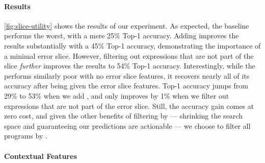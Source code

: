 \paragraph{Results}
\autoref{fig:slice-utility} shows the results of our experiment.
%
As expected, the baseline performs the worst, with a mere 25\% \linear
Top-1 accuracy.
%
Adding \InSlice improves the results substantially with a 45\% \linear Top-1
accuracy, demonstrating the importance of a minimal error slice.
%
However, filtering out expressions that are not part of the slice
\emph{further} improves the results to 54\% \linear Top-1 accuracy.
%
Interestingly, while the \hiddenFH performs similarly poor with no error
slice features, it recovers nearly all of its accuracy after being given
the error slice features.
%
Top-1 accuracy jumps from 29\% to 53\% when we add \InSlice, and only
improves by 1\% when we filter out expressions that are not part of the
error slice.
%
Still, the accuracy gain comes at zero cost, and given the other benefits
of filtering by \InSlice %
--- shrinking the search space and guaranteeing our predictions are actionable ---
we choose to filter all programs by \InSlice.

\paragraph{Contextual Features}
\label{sec:nate:contextual-features}


